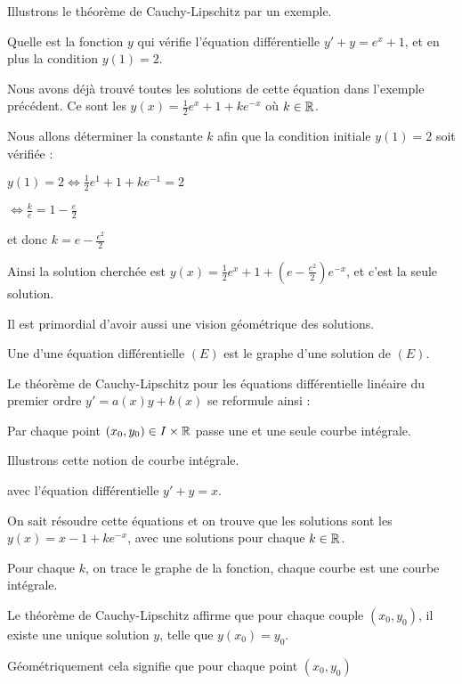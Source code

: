 Illustrons le théorème de Cauchy-Lipschitz par un exemple.


Quelle est la fonction $y$ qui vérifie l'équation différentielle
$y'+y = e^x+1$, et en plus la condition  $y(1)=2$.

\change
Nous avons déjà trouvé toutes les solutions de cette 
équation dans l'exemple précédent.
Ce sont les  $y(x) = \frac12e^{x}+1 + k e^{-x}$
où $k\in\mathbb{R}$. 

\change
Nous allons déterminer la constante $k$ afin que la condition initiale
$y(1)=2$ soit vérifiée :

\change \change
$y(1)=2 \iff \frac12e^{1}+1 + k e^{-1} = 2$

\change
$\iff \frac{k}{e} = 1 - \frac{e}{2}$

\change
et donc $k = e - \frac{e^2}{2}$

\change
Ainsi la solution cherchée est 
$y(x) = \frac12e^{x}+1 + \left(e - \frac{e^2}{2}\right)e^{-x}$,
et c'est la seule solution.


\diapo

Il est primordial d'avoir aussi une vision géométrique
des solutions.

Une  d'une équation différentielle $(E)$
est le graphe d'une solution de $(E)$.

\change
Le théorème de Cauchy-Lipschitz pour les équations 
différentielle linéaire du premier ordre $y'=a(x)y + b(x)$
se reformule ainsi :

\og Par chaque point $(x_0,y_0) \in I \times \mathbb{R}$
passe une et une seule courbe intégrale. \fg


\diapo

Illustrons cette notion de courbe intégrale.

avec l'équation différentielle $y'+y=x$.


\change
On sait résoudre cette équations et on trouve que les solutions
sont les $y(x) = x-1 + ke^{-x}$, avec une solutions pour chaque 
$k \in\mathbb{R}$.

Pour chaque $k$, on trace le graphe de la fonction, chaque courbe est une courbe intégrale.

\change

Le théorème de Cauchy-Lipschitz affirme que pour chaque couple 
$(x_0,y_0)$, il existe une unique solution
$y$, telle que $y(x_0)=y_0$. 

\change
Géométriquement cela signifie que pour chaque point 
$(x_0,y_0)$ 


